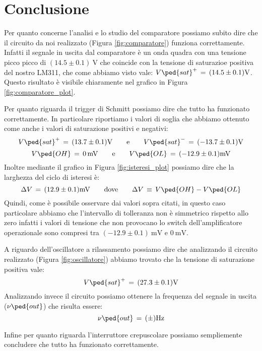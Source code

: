 \section*{Conclusione}

Per quanto concerne l'analisi e lo studio del comparatore possiamo subito dire che il circuito da noi realizzato (Figura \ref{fig:comparatore}) funziona correttamente. Infatti il segnale in uscita dal comparatore è un onda quadra con una tensione picco picco di $(14.5\pm0.1)\SI{}{\volt}$ che coincide con la tensione di saturazioe positiva del nostro LM311, che come abbiamo visto vale: $V\ped{sat}^+\,=\,(14.5\pm0.1)\SI{}{\volt}$. Questo risultato è visibile chiaramente nel grafico in Figura \ref{fig:comparatore_plot}.

Per quanto riguarda il trigger di Schmitt possiamo dire che tutto ha funzionato correttamente. In particolare riportiamo i valori di soglia che abbiamo ottenuto come anche i valori di saturazione positivi e negativi:
\begin{equation}
        V\ped{sat}^+\,=\,(13.7\pm0.1)\SI{}{\volt} \qquad \text{e} \qquad V\ped{sat}^-\,=\,(-13.7\pm0.1)\SI{}{\volt}
\end{equation}
\begin{equation}
        V\ped{OH}\,=\,\SI{0}{\milli\volt} \qquad \text{e} \qquad V\ped{OL}\,=\,(-12.9\pm0.1)\SI{}{\milli\volt}
\end{equation}
Inoltre mediante il grafico in Figura \ref{fig:isteresi_plot} possiamo dire che la larghezza del ciclo di isteresi è:
\begin{equation}
        \Delta V \,=\,(12.9\pm0.1)\SI{}{\milli\volt} \qquad \text{dove} \qquad \Delta V \,\equiv\, V\ped{OH} - V\ped{OL} 
\end{equation}
Quindi, come è possibile osservare dai valori sopra citati, in questo caso particolare abbiamo che l'intervallo di tolleranza non è simmetrico rispetto allo zero infatti i valori di tensione che non provocano lo switch dell'amplificatore operazionale sono compresi tra $(-12.9\pm0.1)\SI{}{\milli\volt}$ e $\SI{0}{\milli\volt}$.

A riguardo dell'oscillatore a rilassamento possiamo dire che analizzando il circuito realizzato (Figura \ref{fig:oscillatore}) abbiamo trovato che la tensione di saturazione positiva vale:
\begin{equation}
        V\ped{sat}^+\,=\,(27.3\pm0.1)\SI{}{\volt}
\end{equation}
Analizzando invece il circuito possiamo ottenere la frequenza del segnale in uscita ($\nu\ped{out}$) che risulta essere:
\begin{equation}
        \nu\ped{out}\,=\,(\pm)\SI{}{\hertz}
\end{equation}

Infine per quanto riguarda l'interruttore crepuscolare possiamo sempliemente concludere che tutto ha funzionato correttamente.

